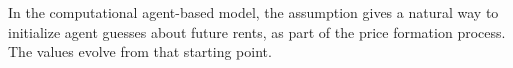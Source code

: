 



In the computational agent-based  model, the assumption gives a natural way to initialize agent guesses about future rents, as part of the \gls{price formation} process. The values evolve from that starting point. 



